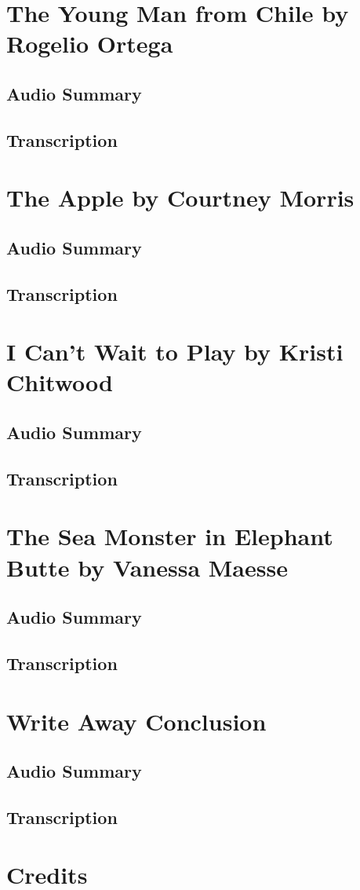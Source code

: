\section{The Young Man from Chile by Rogelio Ortega}

\subsection{Audio Summary}

\subsection{Transcription}

\section{The Apple by Courtney Morris}

\subsection{Audio Summary}

\subsection{Transcription}

\section{I Can't Wait to Play by Kristi Chitwood}

\subsection{Audio Summary}

\subsection{Transcription}

\section{The Sea Monster in Elephant Butte by Vanessa Maesse}

\subsection{Audio Summary}

\subsection{Transcription}

\section{Write Away Conclusion}

\subsection{Audio Summary}

\subsection{Transcription}

\section{Credits}